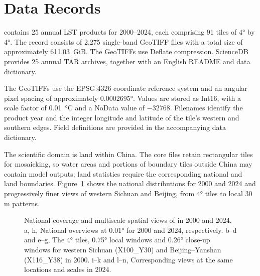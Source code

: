 \section{Data Records}

\chinatherm{} contains 25 annual LST products for 2000--2024, each comprising 91 tiles of 4° by 4°. The record consists of 2,275 single-band GeoTIFF files with a total size of approximately 611.03~GiB. The GeoTIFFs use Deflate compression. ScienceDB provides 25 annual TAR archives, together with an English README and data dictionary\supercite{liang2026chinatherm30}.

The GeoTIFFs use the EPSG:4326 coordinate reference system and an angular pixel spacing of approximately 0.0002695°. Values are stored as Int16, with a scale factor of 0.01~°C and a NoData value of $-32768$. Filenames identify the product year and the integer longitude and latitude of the tile's western and southern edges. Field definitions are provided in the accompanying data dictionary.

The scientific domain is land within China. The core files retain rectangular tiles for mosaicking, so water areas and portions of boundary tiles outside China may contain model outputs; land statistics require the corresponding national and land boundaries. Figure~\ref*{fig:data-records} shows the national distributions for 2000 and 2024 and progressively finer views of western Sichuan and Beijing, from 4° tiles to local 30 m patterns.

\begin{figure}[H]
\centering
{}
\ReviewFloatBegin
\caption{National coverage and multiscale spatial views of \chinatherm{} in 2000 and 2024. a, h, National overviews at 0.01° for 2000 and 2024, respectively. b--d and e--g, The 4° tiles, 0.75° local windows and 0.26° close-up windows for western Sichuan (X100\_Y30) and Beijing--Yanshan (X116\_Y38) in 2000. i--k and l--n, Corresponding views at the same locations and scales in 2024.}
\label{fig:data-records}
\ReviewFloatEnd
\end{figure}
